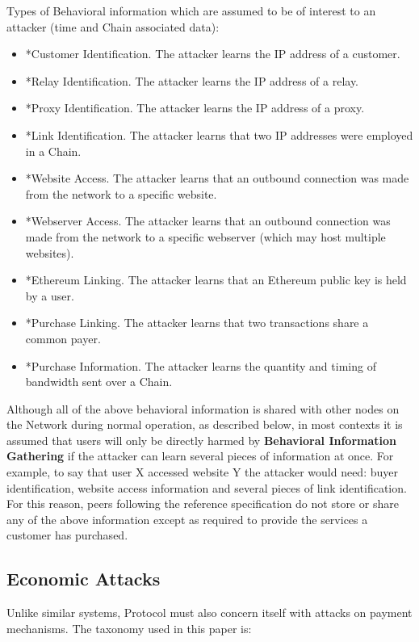 Types of Behavioral information which are assumed to be of interest to an attacker (time and Chain associated data):

\begin{itemize}
\item *Customer Identification. The attacker learns the IP address of a customer.
\item *Relay Identification. The attacker learns the IP address of a relay.
\item *Proxy Identification. The attacker learns the IP address of a proxy.
\item *Link Identification. The attacker learns that two IP addresses were employed in a Chain.
\item *Website Access. The attacker learns that an outbound connection was made from the \Orchid{} network to a specific website.
\item *Webserver Access. The attacker learns that an outbound connection was made from the \Orchid{} network to a specific webserver (which may host multiple websites).
\item *Ethereum Linking. The attacker learns that an Ethereum public key is held by a \Orchid{} user.
\item *Purchase Linking. The attacker learns that two transactions share a common payer.
\item *Purchase Information. The attacker learns the quantity and timing of bandwidth sent over a Chain.
\end{itemize}

Although all of the above behavioral information is shared with other nodes on the \Orchid{} Network during normal operation, as described below, in most contexts it is assumed that users will only be directly harmed by \textbf{Behavioral Information Gathering} if the attacker can learn several pieces of information at once. For example, to say that user X accessed website Y the attacker would need: buyer identification, website access information and several pieces of link identification. For this reason, peers following the reference specification do not store or share any of the above information except as required to provide the services a customer has purchased.

\subsection{Economic Attacks}
\label{econ-attacks}

Unlike similar systems, \Orchid{} Protocol must also concern itself with attacks on payment mechanisms. The taxonomy used in this paper is:

